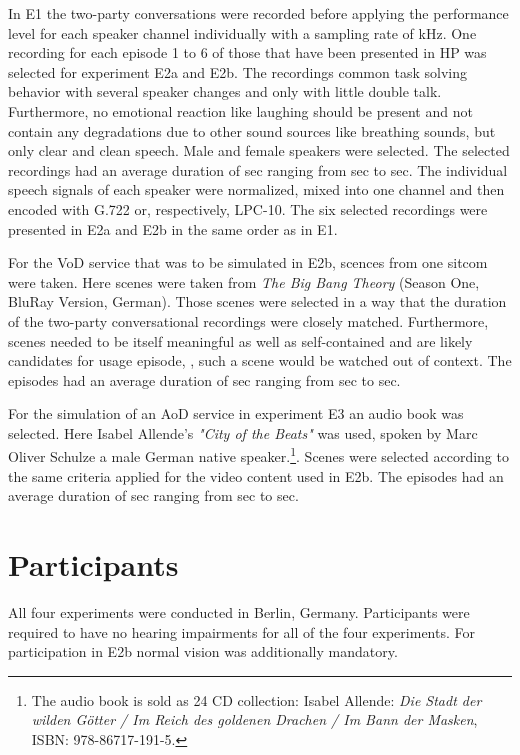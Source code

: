In E1 the two-party conversations were recorded before applying the performance level for each speaker channel individually with a sampling rate of \unit[16]{kHz}.
One recording for each episode 1 to 6 of those that have been presented in \ac{HP} was selected for experiment E2a and E2b.
The recordings common task solving behavior with several speaker changes and only with little double talk.
Furthermore, no emotional reaction like laughing should be present and not contain any degradations due to other sound sources like breathing sounds, but only clear and clean speech.
Male and female speakers were selected.
The selected recordings had an average duration of \unit[153]{sec} ranging from \unit[128]{sec} to \unit[194]{sec}.
The individual speech signals of each speaker were normalized, mixed into one channel and then encoded with G.722 or, respectively, LPC-10.
The six selected recordings were presented in E2a and E2b in the same order as in E1.

For the \ac{VoD} service that was to be simulated in E2b, scences from one sitcom were taken.
Here scenes were taken from \emph{The Big Bang Theory} (Season One, BluRay Version, German).
Those scenes were selected in a way that the duration of the two-party conversational recordings were closely matched.
Furthermore, scenes needed to be itself meaningful as well as self-contained and are likely candidates for usage episode, \ie, such a scene would be watched out of context.
The episodes had an average duration of \unit[166]{sec} ranging from \unit[134]{sec} to \unit[198]{sec}.

For the simulation of an \ac{AoD} service in experiment E3 an audio book was selected.
Here Isabel Allende's \emph{"City of the Beats"}  was used, spoken by Marc Oliver Schulze a male German native speaker.\footnote{The audio book is sold as 24 CD collection: Isabel Allende: \emph{Die Stadt der wilden Götter / Im Reich des goldenen Drachen / Im Bann der Masken}, ISBN: 978-86717-191-5.}.
Scenes were selected according to the same criteria applied for the video content used in E2b.
The episodes had an average duration of \unit[184]{sec} ranging from \unit[174]{sec} to \unit[199]{sec}.


\section{Participants}
All four experiments were conducted in Berlin, Germany.
Participants were required to have no hearing impairments for all of the four experiments.
For participation in E2b normal vision was additionally mandatory.

